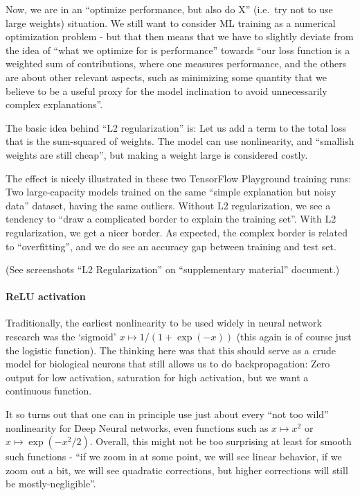 \documentclass[11pt]{article}
\begin{document}
Now, we are in an ``optimize performance, but also do X'' (i.e.~try not
to use large weights) situation. We still want to consider ML training
as a numerical optimization problem - but that then means that we have
to slightly deviate from the idea of ``what we optimize for is
performance'' towards ``our loss function is a weighted sum of
contributions, where one measures performance, and the others are about
other relevant aspects, such as minimizing some quantity that we believe
to be a useful proxy for the model inclination to avoid unnecessarily
complex explanations''.

The basic idea behind ``L2 regularization'' is: Let us add a term to the
total loss that is the sum-squared of weights. The model can use
nonlinearity, and ``smallish weights are still cheap'', but making a
weight large is considered costly.

The effect is nicely illustrated in these two TensorFlow Playground
training runs: Two large-capacity models trained on the same ``simple
explanation but noisy data'' dataset, having the same outliers. Without
L2 regularization, we see a tendency to ``draw a complicated border to
explain the training set''. With L2 regularization, we get a nicer
border. As expected, the complex border is related to ``overfitting'',
and we do see an accuracy gap between training and test set.

(See screenshots ``L2 Regularization'' on ``supplementary material''
document.)

\hypertarget{relu-activation}{%
\paragraph{\texorpdfstring{\textbf{ReLU
activation}}{ReLU activation}}\label{relu-activation}}

Traditionally, the earliest nonlinearity to be used widely in neural
network research was the `sigmoid' \(x\mapsto 1/(1+\exp(-x))\) (this
again is of course just the logistic function). The thinking here was
that this should serve as a crude model for biological neurons that
still allows us to do backpropagation: Zero output for low activation,
saturation for high activation, but we want a continuous function.

It so turns out that one can in principle use just about every ``not too
wild'' nonlinearity for Deep Neural networks, even functions such as
\(x\mapsto x^2\) or \(x\mapsto\exp(-x^2/2)\). Overall, this might not be
too surprising at least for smooth such functions - ``if we zoom in at
some point, we will see linear behavior, if we zoom out a bit, we will
see quadratic corrections, but higher corrections will still be
mostly-negligible''.
\end{document}
